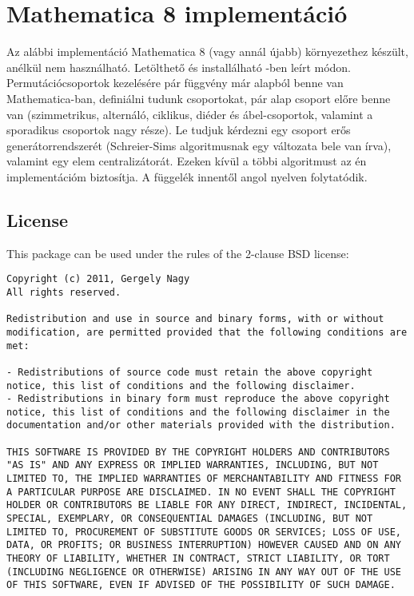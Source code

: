 \section{Mathematica 8 implementáció}
Az alábbi implementáció Mathematica 8 (vagy annál újabb) környezethez készült, anélkül nem használható.
Letölthető és installálható \cite{Nag11}-ben leírt módon.
Permutációcsoportok kezelésére pár függvény már alapból benne van Mathematica-ban,
definiálni tudunk csoportokat, pár alap csoport előre benne van
(szimmetrikus, alternáló, ciklikus, diéder és ábel-csoportok, valamint a sporadikus csoportok nagy része).
Le tudjuk kérdezni egy csoport erős generátorrendszerét (Schreier-Sims algoritmusnak egy változata bele van írva),
valamint egy elem centralizátorát.
Ezeken kívül a többi algoritmust az én implementációm biztosítja.
A függelék innentől angol nyelven folytatódik.
\clearpage

\subsection{License}
This package can be used under the rules of the 2-clause BSD license:
\lstset{
	breaklines=true,
	showstringspaces=false,
}
\begin{lstlisting}
Copyright (c) 2011, Gergely Nagy
All rights reserved.

Redistribution and use in source and binary forms, with or without modification, are permitted provided that the following conditions are met:

- Redistributions of source code must retain the above copyright notice, this list of conditions and the following disclaimer.
- Redistributions in binary form must reproduce the above copyright notice, this list of conditions and the following disclaimer in the documentation and/or other materials provided with the distribution.

THIS SOFTWARE IS PROVIDED BY THE COPYRIGHT HOLDERS AND CONTRIBUTORS "AS IS" AND ANY EXPRESS OR IMPLIED WARRANTIES, INCLUDING, BUT NOT LIMITED TO, THE IMPLIED WARRANTIES OF MERCHANTABILITY AND FITNESS FOR A PARTICULAR PURPOSE ARE DISCLAIMED. IN NO EVENT SHALL THE COPYRIGHT HOLDER OR CONTRIBUTORS BE LIABLE FOR ANY DIRECT, INDIRECT, INCIDENTAL, SPECIAL, EXEMPLARY, OR CONSEQUENTIAL DAMAGES (INCLUDING, BUT NOT LIMITED TO, PROCUREMENT OF SUBSTITUTE GOODS OR SERVICES; LOSS OF USE, DATA, OR PROFITS; OR BUSINESS INTERRUPTION) HOWEVER CAUSED AND ON ANY THEORY OF LIABILITY, WHETHER IN CONTRACT, STRICT LIABILITY, OR TORT (INCLUDING NEGLIGENCE OR OTHERWISE) ARISING IN ANY WAY OUT OF THE USE OF THIS SOFTWARE, EVEN IF ADVISED OF THE POSSIBILITY OF SUCH DAMAGE.
\end{lstlisting}
\clearpage

